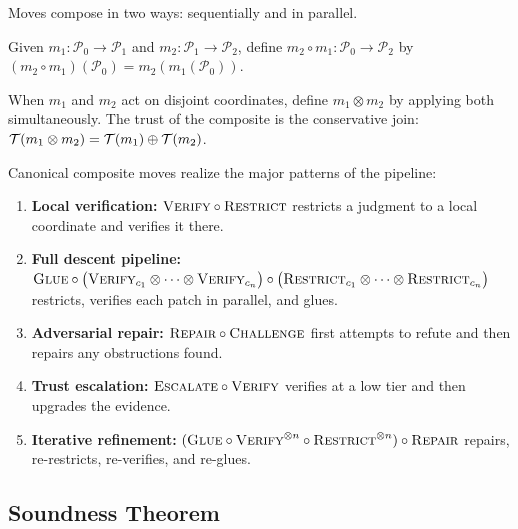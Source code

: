 Moves compose in two ways: sequentially and in parallel.

\begin{definition}\label{def:seq-compose}
Given $m_1 : \mathcal{P}_0 \to \mathcal{P}_1$ and
$m_2 : \mathcal{P}_1 \to \mathcal{P}_2$, define
$m_2 \circ m_1 : \mathcal{P}_0 \to \mathcal{P}_2$ by
$(m_2 \circ m_1)(\mathcal{P}_0) = m_2(m_1(\mathcal{P}_0))$.
\end{definition}

\begin{definition}\label{def:par-compose}
When $m_1$ and $m_2$ act on disjoint coordinates, define
$m_1 \otimes m_2$ by applying both simultaneously.  The trust of
the composite is the conservative join:
$\mathcal{T}(m_1 \otimes m_2) = \mathcal{T}(m_1) \oplus \mathcal{T}(m_2)$.
\end{definition}

Canonical composite moves realize the major patterns of the pipeline:

\begin{enumerate}[label=(\roman*),nosep]
  \item \textbf{Local verification:}
    $\textsc{Verify} \circ \textsc{Restrict}$ restricts a judgment to a local
    coordinate and verifies it there.

  \item \textbf{Full descent pipeline:}
    $\textsc{Glue} \circ \bigl(\textsc{Verify}_{c_1} \otimes \cdots \otimes
     \textsc{Verify}_{c_n}\bigr) \circ \bigl(\textsc{Restrict}_{c_1} \otimes
     \cdots \otimes \textsc{Restrict}_{c_n}\bigr)$
    restricts, verifies each patch in parallel, and glues.

  \item \textbf{Adversarial repair:}
    $\textsc{Repair} \circ \textsc{Challenge}$ first attempts to refute and then
    repairs any obstructions found.

  \item \textbf{Trust escalation:}
    $\textsc{Escalate} \circ \textsc{Verify}$ verifies at a low tier and then
    upgrades the evidence.

  \item \textbf{Iterative refinement:}
    $(\textsc{Glue} \circ \textsc{Verify}^{\otimes n} \circ \textsc{Restrict}^{\otimes n})
    \circ \textsc{Repair}$ repairs, re-restricts, re-verifies, and re-glues.
\end{enumerate}

\subsection{Soundness Theorem}\label{sec:move-soundness}

